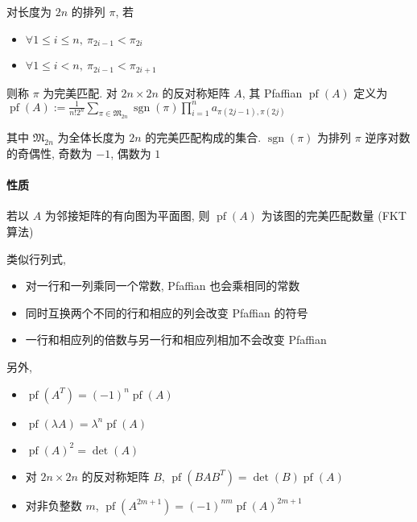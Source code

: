 对长度为 \(2n\) 的排列 \(\pi\), 若

\begin{itemize}
    \item \(\forall 1\le i\le n,~\pi_{2i-1}<\pi_{2i}\)
    \item \(\forall 1\le i< n,~\pi_{2i-1}<\pi_{2i+1}\)
\end{itemize}

则称 \(\pi\) 为完美匹配. 对 \(2n\times 2n\) 的反对称矩阵 \(A\), 其 Pfaffian \(\operatorname{pf}(A)\) 定义为 \(\displaystyle\operatorname{pf}(A):=\frac{1}{n!2^n}\sum_{\pi\in \mathfrak{M}_{2n}}\operatorname{sgn}(\pi)\prod_{i=1}^n a_{\pi(2j-1),\pi(2j)}\)

其中 \(\mathfrak{M}_{2n}\) 为全体长度为 \(2n\) 的完美匹配构成的集合. \(\operatorname{sgn}(\pi)\) 为排列 \(\pi\) 逆序对数的奇偶性, 奇数为 \(-1\), 偶数为 \(1\)

\paragraph{性质}

若以 \(A\) 为邻接矩阵的有向图为平面图, 则 \(\operatorname{pf}(A)\) 为该图的完美匹配数量 (FKT 算法)

类似行列式,

\begin{itemize}
    \item 对一行和一列乘同一个常数, Pfaffian 也会乘相同的常数
    \item 同时互换两个不同的行和相应的列会改变 Pfaffian 的符号
    \item 一行和相应列的倍数与另一行和相应列相加不会改变 Pfaffian
\end{itemize}

另外,

\begin{itemize}
    \item \(\operatorname{pf}\left(A^T\right)=(-1)^n\operatorname{pf}(A)\)
    \item \(\operatorname{pf}(\lambda A)=\lambda^n\operatorname{pf}(A)\)
    \item \(\operatorname{pf}(A)^2=\operatorname{det}(A)\)
    \item 对 \(2n\times 2n\) 的反对称矩阵 \(B\), \(\operatorname{pf}\left(BAB^T\right)=\operatorname{det}(B)\operatorname{pf}(A)\)
    \item 对非负整数 \(m\), \(\operatorname{pf}\left(A^{2m+1}\right)=(-1)^{nm}\operatorname{pf}(A)^{2m+1}\)
\end{itemize}

